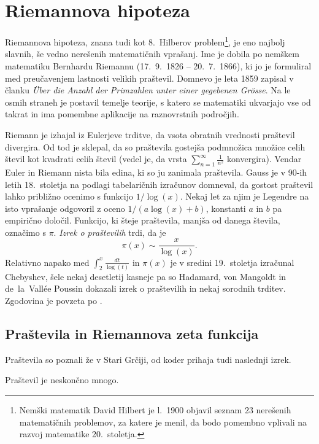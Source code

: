 \documentclass[mat1]{fmfdelo}
\begin{document}
\section{Riemannova hipoteza}

Riemannova hipoteza, znana tudi kot 8.~Hilberov problem\footnote{Nemški matematik David Hilbert je l.~1900 objavil seznam 23 nerešenih matematičnih problemov, za katere je menil, da bodo pomembno vplivali na razvoj matematike 20.~stoletja.}, je eno najbolj slavnih, še vedno nerešenih matematičnih vprašanj. Ime je dobila po nemškem matematiku Bernhardu Riemannu (17.\ 9.\ 1826 -- 20.\ 7.\ 1866), ki jo je formuliral med preučavenjem lastnosti velikih praštevil. Domnevo je leta 1859 zapisal v članku \emph{\"Uber die Anzahl der Primzahlen unter einer gegebenen Gr\"osse}. Na le osmih straneh je postavil temelje teorije, s katero se matematiki ukvarjajo vse od takrat in ima pomembne aplikacije na raznovrstnih področjih. 

Riemann je izhajal iz Eulerjeve trditve, da vsota obratnih vrednosti praštevil divergira. Od tod je sklepal, da so praštevila gostejša podmnožica množice celih števil kot kvadrati celih števil (vedel je, da vrsta $\sum_{n=1}^{\infty} \frac{1}{n^2}$ konvergira).
Vendar Euler in Riemann nista bila edina, ki so ju zanimala praštevila. Gauss je v 90-ih letih 18.~stoletja na podlagi tabelaričnih izračunov domneval, da gostost praštevil lahko približno ocenimo s funkcijo $1/ \log(x)$. Nekaj let za njim je Legendre na isto vprašanje odgovoril z oceno $1/ (a\log(x)+b)$, konstanti $a$ in $b$ pa empirično določil. 
Funkcijo, ki šteje praštevila, manjša od danega števila, označimo s $\pi$. \emph{Izrek o praštevilih} trdi, da je
\begin{equation}
\pi(x) \sim \frac{x}{\log(x)}.
\end{equation}
%
Relativno napako med $\int_{2}^x \frac{dt}{\log(t)}$ in $\pi(x)$ je v sredini 19.~stoletja izračunal Chebyshev, šele nekaj desetletij kasneje pa so Hadamard, von Mangoldt in de~la~Vall\'ee Poussin dokazali izrek o praštevilih in nekaj sorodnih trditev. Zgodovina je povzeta po \cite[poglavje 1.1]{zetafunction}.
%
\subsection{Praštevila in Riemannova zeta funkcija}

Praštevila so poznali že v Stari Grčiji, od koder prihaja tudi naslednji izrek.
\begin{izrek}[Evklid]
Praštevil je neskončno mnogo.
\end{izrek}
\end{document}
